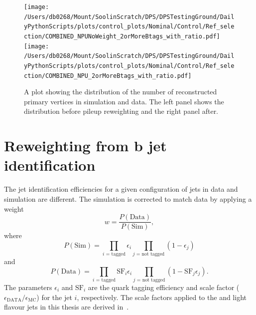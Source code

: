 \begin{figure}[htpb]
	\centering
	\texttt{[image: /Users/db0268/Mount/SoolinScratch/DPS/DPSTestingGround/DailyPythonScripts/plots/control\_plots/Nominal/Control/Ref\_selection/COMBINED\_NPUNoWeight\_2orMoreBtags\_with\_ratio.pdf]}
	\texttt{[image: /Users/db0268/Mount/SoolinScratch/DPS/DPSTestingGround/DailyPythonScripts/plots/control\_plots/Nominal/Control/Ref\_selection/COMBINED\_NPU\_2orMoreBtags\_with\_ratio.pdf]}
	\caption[A plot showing the distribution of the number of reconstructed primary vertices in simulation and data. The left panel shows the distribution before pileup reweighting and the right panel after.]{A plot showing the distribution of the number of reconstructed primary vertices in simulation and data. The left panel shows the distribution before pileup reweighting and the right panel after.}
	\label{fig:PU}
\end{figure}

\section{Reweighting from b jet identification} %
\label{sub:reweighting_from_b_jet_identification}

The \bquark{} jet identification efficiencies for a given configuration of jets in data and simulation are different.
The simulation is corrected to match data by applying a weight
\begin{equation*}
	w = \frac{P(\mathrm{Data})}{P(\mathrm{Sim})},
\end{equation*}
where
\begin{equation*}
	P(\mathrm{Sim}) = \prod_{i\text{ = tagged}}\epsilon_{i}\prod_{j\text{ = not tagged}}(1 - \epsilon_{j})
\end{equation*}
and
\begin{equation*}
	P(\mathrm{Data}) = \prod_{i\text{ = tagged}}\mathrm{SF}_{i}\epsilon_{i}\prod_{j\text{ = not tagged}}(1 - \mathrm{SF}_{j}\epsilon_{j}).
\end{equation*}
The parameters $\epsilon_{i}$ and $\mathrm{SF}_{i}$ are the \bquark{} quark tagging efficiency and scale factor ($\epsilon_{\mathrm{DATA}}/\epsilon_{\mathrm{MC}}$) for the jet $i$, respectively.
The scale factors applied to the \bquark{} and light flavour jets in this thesis are derived in~\cite{Event:BTV}.

